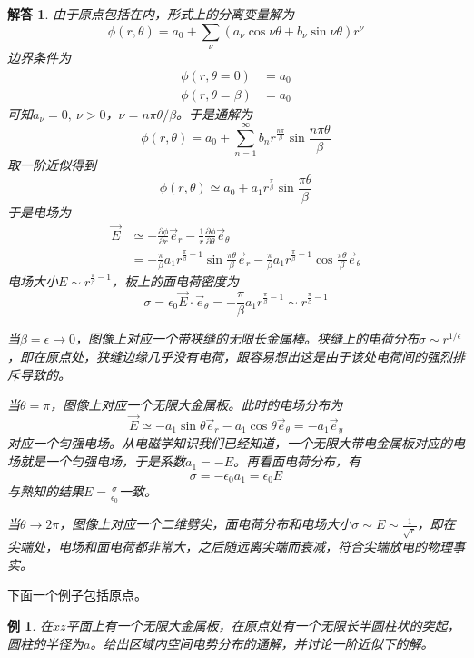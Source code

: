 \documentclass[a4paper,11pt]{ctexbook}
\newtheorem{eg}{例}[section]
\newtheorem{ans}{解答}[section]
\newcommand{\beq}{\begin{equation}}
\newcommand{\eeq}{\end{equation}}
\newcommand{\bea}{\begin{equation}\begin{aligned}}
\newcommand{\eea}{\end{aligned}\end{equation}}
\newcommand{\epv}{\epsilon_0}
\newcommand{\pfrac}[2]{\frac{\partial #1}{\partial #2}}
\begin{document}
\begin{ans}
由于原点包括在内，形式上的分离变量解为
\beq
\phi(r,\theta) = a_0 + \sum_\nu (a_\nu \cos \nu \theta + b_\nu \sin \nu \theta) r^\nu
\eeq
边界条件为
\bea
\phi(r,\theta=0) &= a_0 \\
\phi(r,\theta=\beta) &= a_0
\eea
可知$a_\nu = 0,\ \nu>0$，$\nu = n\pi \theta /\beta$。于是通解为
\beq
\phi(r,\theta) = a_0 + \sum_{n=1}^\infty b_n r^{\frac{n\pi }{\beta}} \sin \frac{n\pi \theta}{\beta}
\eeq
取一阶近似得到
\beq
\phi(r,\theta) \simeq a_0 + a_1 r^\frac{\pi }{\beta} \sin \frac{\pi \theta}{\beta}
\eeq
于是电场为
\bea
\vec{E} &\simeq -\pfrac{\phi}{r} \vec{e}_r - \frac{1}{r} \pfrac{\phi}{\theta} \vec{e}_\theta \\
&=-\frac{\pi }{\beta}a_1 r^{\frac{\pi }{\beta}-1} \sin \frac{\pi  \theta}{\beta} \vec{e}_r-\frac{\pi }{\beta} a_1 r^{\frac{\pi }{\beta}-1} \cos \frac{\pi \theta }{\beta} \vec{e}_\theta
\eea
电场大小$E \sim r^{\frac{\pi }{\beta}-1}$，板上的面电荷密度为
\beq
\sigma = \epv \vec{E} \cdot \vec{e}_\theta  = -\frac{\pi }{\beta} a_1 r^{\frac{\pi }{\beta}-1}\sim r^{\frac{\pi}{\beta} - 1}
\eeq
\par
当$\beta = \epsilon \to 0$，图像上对应一个带狭缝的无限长金属棒。狭缝上的电荷分布$\sigma \sim r^{1/\epsilon}$，即在原点处，狭缝边缘几乎没有电荷，跟容易想出这是由于该处电荷间的强烈排斥导致的。
\par
当$\theta = \pi$，图像上对应一个无限大金属板。此时的电场分布为
\beq
\vec{E} \simeq - a_1 \sin \theta \vec{e}_r - a_1 \cos \theta \vec{e}_\theta = -a_1 \vec{e}_y
\eeq
对应一个匀强电场。从电磁学知识我们已经知道，一个无限大带电金属板对应的电场就是一个匀强电场，于是系数$a_1=-E$。再看面电荷分布，有
\beq
\sigma = - \epv a_1 =\epv E
\eeq
与熟知的结果$E = \frac{\sigma}{\epv}$一致。
\par
当$\theta \to 2\pi$，图像上对应一个二维劈尖，面电荷分布和电场大小$\sigma \sim E\sim \frac{1}{\sqrt{r}}$，即在尖端处，电场和面电荷都非常大，之后随远离尖端而衰减，符合尖端放电的物理事实。
\end{ans}
下面一个例子包括原点。
\begin{eg}
在$xz$平面上有一个无限大金属板，在原点处有一个无限长半圆柱状的突起，圆柱的半径为$a$。给出区域内空间电势分布的通解，并讨论一阶近似下的解。
\end{eg}
\end{document}
